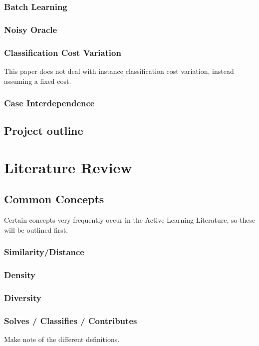 \documentclass[a4paper,11pt]{report}
\begin{document}
\subsection{Batch Learning}



\subsection{Noisy Oracle}
\subsection{Classification Cost Variation}
This paper does not deal with instance classification cost variation, instead assuming a fixed cost.

\subsection{Case Interdependence}

\section{Project outline}

\chapter{Literature Review}

\section{Common Concepts}
Certain concepts very frequently occur in the Active Learning Literature, so these will be outlined first.

\subsection{Similarity/Distance}
\subsection{Density}
\subsection{Diversity}
\subsection{Solves / Classifies / Contributes}
Make note of the different definitions.
\end{document}
